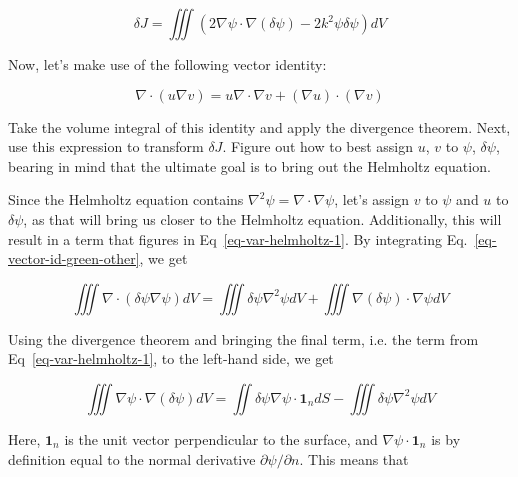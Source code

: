 \begin{equation}
\delta J = \iiint \left( 2 \nabla \psi \cdot \nabla (\delta \psi) - 2 k^2 \psi \delta \psi \right) dV \label{eq-var-helmholtz-1}
\end{equation}

Now, let's make use of the following vector identity:

\begin{equation}
\nabla \cdot (u \nabla v) = u \nabla \cdot \nabla v + (\nabla u) \cdot (\nabla v) \label{eq-vector-id-green-other}
\end{equation} 

\noindent{}

\begin{cue}
Take the volume integral of this identity and apply the divergence theorem. Next, use this expression to transform $\delta J$. Figure out how to best assign $u$, $v$ to $\psi$, $\delta \psi$, bearing in mind that the ultimate goal is to bring out the Helmholtz equation.
\end{cue}

Since the Helmholtz equation contains $\nabla^2 \psi = \nabla \cdot \nabla \psi$, let's assign $v$ to $\psi$ and $u$ to $\delta \psi$, as that will bring us closer to the Helmholtz equation. Additionally, this will result in a term that figures in Eq~\ref{eq-var-helmholtz-1}. By integrating Eq.~\ref{eq-vector-id-green-other}, we get

\begin{equation}
  \iiint  \nabla \cdot (\delta \psi \nabla \psi) dV =  \iiint \delta \psi  \nabla^2 \psi dV + 
  \iiint  \nabla (\delta \psi) \cdot \nabla \psi  dV  
\end{equation} 

Using the divergence theorem and bringing the final term, i.e. the term from Eq~\ref{eq-var-helmholtz-1}, to the left-hand side, we get

\begin{equation}
\iiint \nabla \psi \cdot \nabla (\delta \psi) dV = \iint \delta \psi {\nabla \psi} \cdot \mathbf{1}_n dS - \iiint \delta \psi \nabla^2 \psi dV
\end{equation} 

Here, $\mathbf{1}_n$ is the unit vector perpendicular to the surface, and ${\nabla \psi} \cdot \mathbf{1}_n $ is by definition equal to the normal derivative ${\partial \psi} / {\partial n}$. This means that

